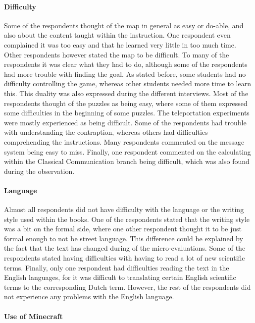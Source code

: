 \documentclass[11pt,twoside]{report} %
\begin{document}
\paragraph{Difficulty}

Some of the respondents thought of the map in general as easy or do-able, and also about the content taught within the instruction. One respondent even complained it was too easy and that he learned very little in too much time. Other respondents however stated the map to be difficult. To many of the respondents it was clear what they had to do, although some of the respondents had more trouble with finding the goal. As stated before, some students had no difficulty controlling the game, whereas other students needed more time to learn this. This duality was also expressed during the different interviews. Most of the respondents thought of the puzzles as being easy, where some of them expressed some difficulties in the beginning of some puzzles. The teleportation experiments were mostly experienced as being difficult. Some of the respondents had trouble with understanding the contraption, whereas others had difficulties comprehending the instructions. Many respondents commented on the message system being easy to miss. Finally, one respondent commented on the calculating within the Classical Communication branch being difficult, which was also found during the observation.

\paragraph{Language}

Almost all respondents did not have difficulty with the language or the writing style used within the books. One of the respondents stated that the writing style was a bit on the formal side, where one other respondent thought it to be just formal enough to not be street language. This difference could be explained by the fact that the text has changed during of the micro-evaluations. Some of the respondents stated having difficulties with having to read a lot of new scientific terms. Finally, only one respondent had difficulties reading the text in the English languages, for it was difficult to translating certain English scientific terms to the corresponding Dutch term. However, the rest of the respondents did not experience any problems with the English language.

\paragraph{Use of Minecraft}
\end{document}
